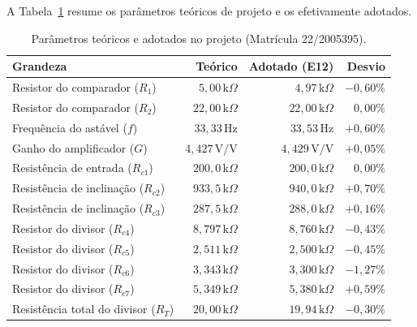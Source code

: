 \documentclass[11pt,a4paper]{article}
\begin{document}
A Tabela~\ref{tab:projeto_lurian} resume os parâmetros teóricos de projeto e os efetivamente adotados.

\begin{table}[H]
\centering
\caption{Parâmetros teóricos e adotados no projeto (Matrícula 22/2005395).}
\label{tab:projeto_lurian}
\renewcommand{\arraystretch}{1.2}
\begin{tabular}{@{}lrrr@{}}
\toprule
\textbf{Grandeza} & \textbf{Teórico} & \textbf{Adotado (E12)} & \textbf{Desvio} \\
\midrule
Resistor do comparador ($R_1$) & $5{,}00\,\text{k}\Omega$ & $4{,}97\,\text{k}\Omega$ & $-0{,}60\%$ \\
Resistor do comparador ($R_2$) & $22{,}00\,\text{k}\Omega$ & $22{,}00\,\text{k}\Omega$ & $0{,}00\%$ \\
Frequência do astável ($f$) & $33{,}33\,\text{Hz}$ & $33{,}53\,\text{Hz}$ & $+0{,}60\%$ \\
Ganho do amplificador ($G$) & $4{,}427\,\text{V/V}$ & $4{,}429\,\text{V/V}$ & $+0{,}05\%$ \\
Resistência de entrada ($R_{c1}$) & $200{,}0\,\text{k}\Omega$ & $200{,}0\,\text{k}\Omega$ & $0{,}00\%$ \\
Resistência de inclinação ($R_{c2}$) & $933{,}5\,\text{k}\Omega$ & $940{,}0\,\text{k}\Omega$ & $+0{,}70\%$ \\
Resistência de inclinação ($R_{c3}$) & $287{,}5\,\text{k}\Omega$ & $288{,}0\,\text{k}\Omega$ & $+0{,}16\%$ \\
Resistor do divisor ($R_{c4}$) & $8{,}797\,\text{k}\Omega$ & $8{,}760\,\text{k}\Omega$ & $-0{,}43\%$ \\
Resistor do divisor ($R_{c5}$) & $2{,}511\,\text{k}\Omega$ & $2{,}500\,\text{k}\Omega$ & $-0{,}45\%$ \\
Resistor do divisor ($R_{c6}$) & $3{,}343\,\text{k}\Omega$ & $3{,}300\,\text{k}\Omega$ & $-1{,}27\%$ \\
Resistor do divisor ($R_{c7}$) & $5{,}349\,\text{k}\Omega$ & $5{,}380\,\text{k}\Omega$ & $+0{,}59\%$ \\
Resistência total do divisor ($R_T$) & $20{,}00\,\text{k}\Omega$ & $19{,}94\,\text{k}\Omega$ & $-0{,}30\%$ \\
\bottomrule
\end{tabular}
\end{table}



\end{document}
